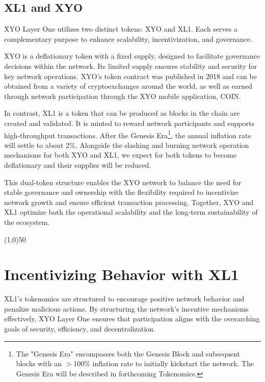 \documentclass{article}
\begin{document}
\subsection{XL1 and XYO}
XYO Layer One utilizes two distinct tokens: XYO and XL1. Each serves a complementary purpose to enhance scalability, incentivization, and governance. 

XYO is a deflationary token with a fixed supply, designed to facilitate governance decisions within the network. Its limited supply ensures stability and security for key network operations. XYO's token contract was published in 2018 and can be obtained from a variety of cryptoexchanges around the world, as well as earned through network participation through the XYO mobile application, COIN.

In contrast, XL1 is a token that can be produced as blocks in the chain are created and validated. It is minted to reward network participants and supports high-throughput transactions. After the Genesis Era\footnote{The "Genesis Era" encompasses both the Genesis Block and subsequent blocks with an $>$100\% inflation rate to initially kickstart the network. The Genesis Era will be described in forthcoming Tokenomics.}, the annual inflation rate will settle to about 2\%. Alongside the slashing and burning network operation mechanisms for both XYO and XL1, we expect for both tokens to become deflationary and their supplies will be reduced.

This dual-token structure enables the XYO network to balance the need for stable governance and ownership with the flexibility required to incentivize network growth and ensure efficient transaction processing. Together, XYO and XL1 optimize both the operational scalability and the long-term sustainability of the ecosystem. 

\begin{center}
    \line(1,0){50}
\end{center}

\section{Incentivizing Behavior with XL1}
XL1's tokenomics are structured to encourage positive network behavior and penalize malicious actions. 
By structuring the network's incentive mechanisms effectively, XYO Layer One ensures that participation aligns with the overarching goals of security, efficiency, and decentralization. 
\end{document}
